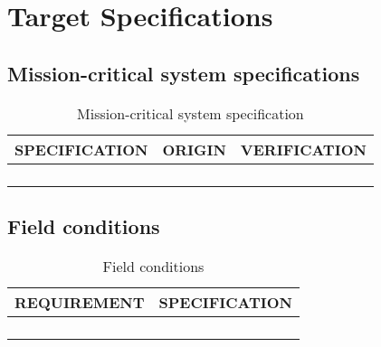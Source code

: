 
\section{Target Specifications}

\subsection{Mission-critical system specifications}

\begin{center}
\begin{longtable}{|p{5cm}|p{5cm}|p{5cm}|}
\hline
  \textbf{SPECIFICATION} &
  \textbf{ORIGIN} &
  \textbf{VERIFICATION}\\
\hline
   &
   &
   \\
\hline
   &
   &
   \\
\hline
   &
   &
   \\
\hline
\caption{Mission-critical system specification}
\end{longtable}
\end{center}

\subsection{Field conditions}

\begin{center}
\begin{longtable}{|p{7.5cm}|p{7.5cm}|}
    \hline
  \textbf{REQUIREMENT} &
  \textbf{SPECIFICATION} \\
\hline
   &
   \\
\hline
   &
   \\
\hline
   &
   \\
\hline
\caption{Field conditions}
\end{longtable}
\end{center}




